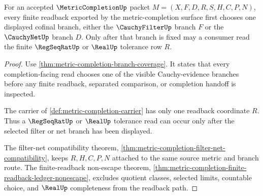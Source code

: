 \begin{theorem}
\label{thm:metric-completion-obligation-branch-readback}
For an accepted $\MetricCompletionUp$ packet $M=(X,F,D,R,S,H,C,P,N)$, every finite readback exported by the metric-completion surface first chooses one displayed cofinal branch, either the $\CauchyFilterUp$ branch $F$ or the $\CauchyNetUp$ branch $D$. Only after that branch is fixed may a consumer read the finite $\RegSeqRatUp$ or $\RealUp$ tolerance row $R$.
\end{theorem}
\begin{proof}
Use \autoref{thm:metric-completion-branch-coverage}. It states that every completion-facing read chooses one of the visible Cauchy-evidence branches before any finite readback, separated comparison, or completion handoff is inspected.

The carrier of \autoref{def:metric-completion-carrier} has only one readback coordinate $R$. Thus a $\RegSeqRatUp$ or $\RealUp$ tolerance read can occur only after the selected filter or net branch has been displayed.

The filter-net compatibility theorem, \autoref{thm:metric-completion-filter-net-compatibility}, keeps $R,H,C,P,N$ attached to the same source metric and branch route. The finite-readback non-escape theorem, \autoref{thm:metric-completion-finite-readback-ledger-nonescape}, excludes quotient classes, selected limits, countable choice, and $\RealUp$ completeness from the readback path.
\end{proof}

